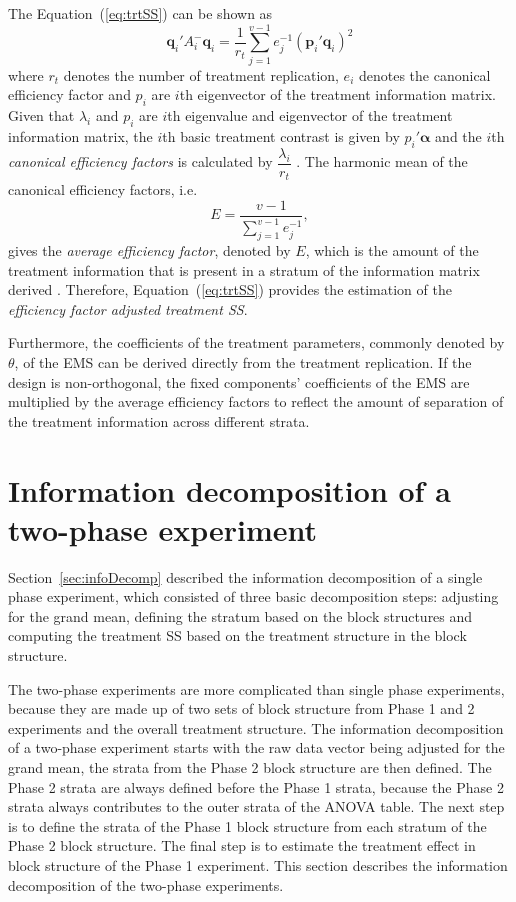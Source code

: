 \documentclass[article]{jss}
\begin{document}
The Equation~(\ref{eq:trtSS}) can be shown as 
\begin{equation}\label{eq:projTrtBlock}
 \bm{q}_{i}' A_{i}^{-} \bm{q}_{i} = \dfrac{1}{r_t} \sum^{v - 1}_{j = 1} e_j^{-1} (\bm{p}_i' \bm{q}_{i})^2
\end{equation}
where $r_t$ denotes the number of treatment replication, $e_i$ denotes the canonical efficiency factor and $p_i$ are $i$th eigenvector of the treatment information matrix. Given that $\lambda_i$ and $p_i$ are $i$th eigenvalue and eigenvector of the treatment information matrix, the $i$th basic treatment contrast is given by $p_i'\bm{\alpha}$ and the $i$th \emph{canonical efficiency factors} is calculated by $\dfrac{\lambda_i}{r_t}$ \citep{John1987}. The harmonic mean of the canonical efficiency factors, i.e.\
\[
E = \dfrac{v-1}{\sum^{v - 1}_{j = 1} e_j^{-1}},
\]
gives the \emph{average efficiency factor}, denoted by $E$, which is the amount of the treatment information that is present in a stratum of the information matrix derived \citep{Yates1936}. Therefore, Equation~(\ref{eq:trtSS}) provides the estimation of the \emph{efficiency factor adjusted treatment SS}.

Furthermore, the coefficients of the treatment parameters, commonly denoted by $\theta$, of the EMS can be derived directly from the treatment replication. If the design is non-orthogonal, the fixed components' coefficients of the EMS are multiplied by the average efficiency factors to reflect the amount of separation of the treatment information across different strata.

\section{Information decomposition of a two-phase experiment} 
\label{sec:infoiDecompTwoPase}
Section~\ref{sec:infoDecomp} described the information decomposition of a single phase experiment, which consisted of three basic decomposition steps: adjusting for the grand mean, defining the stratum based on the block structures and computing the treatment SS based on the treatment structure in the block structure. 

The two-phase experiments are more complicated than single phase experiments, because they are made up of two sets of block structure from Phase 1 and 2 experiments and the overall treatment structure. The information decomposition of a two-phase experiment starts with the raw data vector being adjusted for the grand mean, the strata from the Phase 2 block structure are then defined. The Phase 2 strata are always defined before the Phase 1 strata, because the Phase 2 strata always contributes to the outer strata of the ANOVA table. The next step is to define the strata of the Phase 1 block structure from each stratum of the Phase 2 block structure. The final step is to estimate the treatment effect in block structure of the Phase 1 experiment. This section describes the information decomposition of the two-phase experiments.
\end{document}
